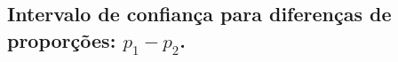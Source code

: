 \documentclass[9pt]{beamer}
\begin{document}
%
%	
%	
%	
%
%

\subsection{Intervalo de confiança para diferenças de proporções: $p_1-p_2$.}
\end{document}
